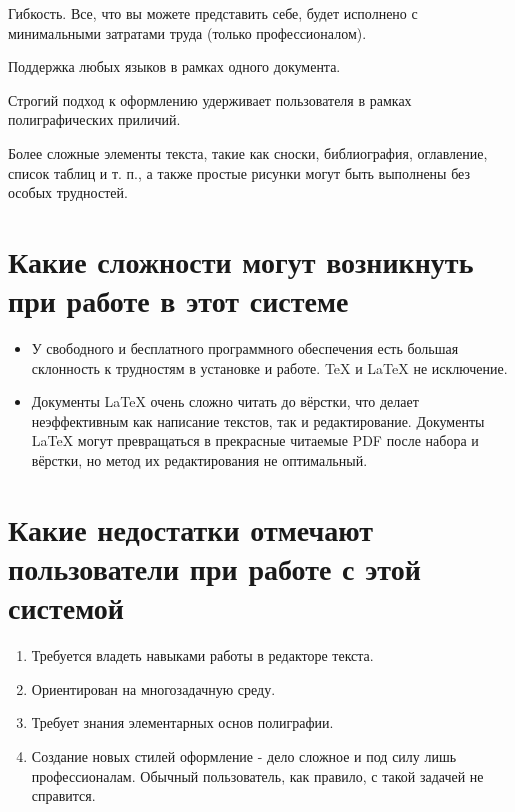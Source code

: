 \documentclass[a4paper,12pt]{article}
\begin{document}
Гибкость. Все, что вы можете представить себе, будет исполнено с минимальными затратами труда (только профессионалом).

Поддержка любых языков в рамках одного документа.

Строгий подход к оформлению удерживает пользователя в рамках полиграфических приличий.

Более сложные элементы текста, такие как сноски, библиография, оглавление, список таблиц и т. п., а также простые рисунки могут быть выполнены без особых трудностей.

\section{Какие сложности могут возникнуть при работе в этот системе}
\begin{flushright}
\begin{itemize}
\item У свободного и бесплатного программного обеспечения есть большая склонность к трудностям в установке и работе. \TeX{} и \LaTeX{} не исключение.

\item Документы \LaTeX{} очень сложно читать до вёрстки, что делает неэффективным как написание текстов, так и редактирование. Документы \LaTeX{} могут превращаться в прекрасные читаемые PDF после набора и вёрстки, но метод их редактирования не оптимальный.
\end{itemize}
\end{flushright}
\section{Какие недостатки отмечают пользователи при работе с этой системой}

\begin{enumerate}
\item Требуется владеть навыками работы в редакторе текста.

\item Ориентирован на многозадачную среду.

\item Требует знания элементарных основ полиграфии.

\item Создание новых стилей оформление - дело сложное и под силу лишь профессионалам. Обычный пользователь, как правило, с такой задачей не справится.
\end{enumerate}
\end{document}
